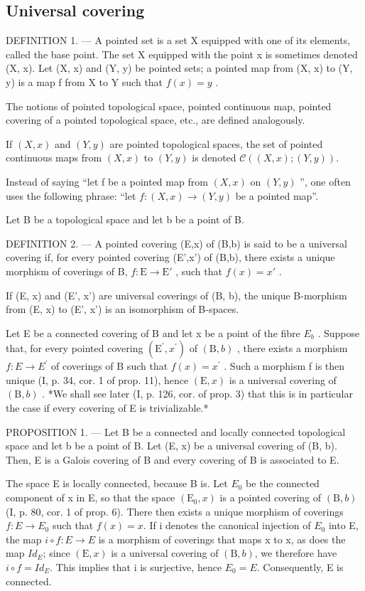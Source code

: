\subsection{Universal covering}

DEFINITION 1. --- A pointed set is a set X equipped with one of its elements, called the base point. The set X equipped with the point x is sometimes denoted (X, x). Let (X, x) and (Y, y) be pointed sets; a pointed map from (X, x) to (Y, y) is a map f from X to Y such that \(f(x) = y\) .

The notions of pointed topological space, pointed continuous map, pointed covering of a pointed topological space, etc., are defined analogously.

If \((X,x)\) and \((Y,y)\) are pointed topological spaces, the set of pointed continuous maps from \((X,x)\) to \((Y,y)\) is denoted \(\mathcal{C}((X,x);(Y,y))\).

Instead of saying “let f be a pointed map from \((X, x)\) on \((Y, y)\) ”, one often uses the following phrase: “let \(f: (X, x) \to (Y, y)\) be a pointed map”.

Let B be a topological space and let b be a point of B.

DEFINITION 2. --- A pointed covering (E,x) of (B,b) is said to be a universal covering if, for every pointed covering (E',x') of (B,b), there exists a unique morphism of coverings of B, \(f: \mathrm{E} \to \mathrm{E}'\) , such that \(f(x) = x'\) .

If (E, x) and (E', x') are universal coverings of (B, b), the unique B-morphism from (E, x) to (E', x') is an isomorphism of B-spaces.

Let E be a connected covering of B and let x be a point of the fibre \(E_{b}\) . Suppose that, for every pointed covering \((\mathrm{E}^{\prime}, x^{\prime})\) of \((\mathrm{B}, b)\) , there exists a morphism \(f: E \to E^{\prime}\) of coverings of B such that \(f(x) = x^{\prime}\) . Such a morphism f is then unique (I, p. 34, cor. 1 of prop. 11), hence \((\mathrm{E}, x)\) is a universal covering of \((\mathrm{B}, b)\) . *We shall see later (I, p. 126, cor. of prop. 3) that this is in particular the case if every covering of E is trivializable.*

PROPOSITION 1. --- Let B be a connected and locally connected topological space and let b be a point of B. Let (E, x) be a universal covering of (B, b). Then, E is a Galois covering of B and every covering of B is associated to E.

The space E is locally connected, because B is. Let \(E_{0}\) be the connected component of x in E, so that the space \((\mathrm{E}_{0}, x)\) is a pointed covering of \((\mathrm{B}, b)\) (I, p. 80, cor. 1 of prop. 6). There then exists a unique morphism of coverings \(f: E \to E_{0}\) such that \(f(x) = x\). If i denotes the canonical injection of \(E_{0}\) into E, the map \(i \circ f: E \to E\) is a morphism of coverings that maps x to x, as does the map \(Id_{E}\); since \((\mathrm{E}, x)\) is a universal covering of \((\mathrm{B}, b)\), we therefore have \(i \circ f = Id_{E}\). This implies that i is surjective, hence \(E_{0} = E\). Consequently, E is connected.

